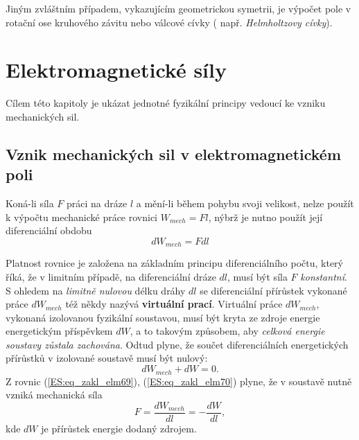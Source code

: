     Jiným zvláštním případem, vykazujícím geometrickou symetrii, je výpočet pole v rotační ose 
    kruhového závitu nebo válcové cívky ( např. \emph{Helmholtzovy cívky}). 
    
  \section{Elektromagnetické síly}\label{ES:sec11}
    Cílem této kapitoly je ukázat jednotné fyzikální principy vedoucí ke vzniku mechanických sil.
    
    \subsection{Vznik mechanických sil v elektromagnetickém poli}
      Koná-li síla \(F\) práci na dráze \(l\) a mění-li během pohybu svoji velikost, nelze použít k 
      výpočtu mechanické práce rovnici \(W_{mech}= Fl\), nýbrž je nutno použít její diferenciální 
      obdobu
      \begin{equation}\label{ES:eq_zakl_elm69}
        dW_{mech} = Fdl
      \end{equation}
      
      Platnost rovnice je založena na základním principu diferenciálního počtu, který říká, že v 
      limitním případě, na diferenciální dráze \(dl\), musí být síla \(F\) \emph{konstantní}. S 
      ohledem na \emph{limitně nulovou} délku dráhy \(dl\) se diferenciální přírůstek vykonané 
      práce \(dW_{mech}\) též někdy nazývá \textbf{virtuální prací}. Virtuální práce \(dW_{mech}\), 
      vykonaná izolovanou fyzikální soustavou, musí být kryta ze zdroje energie energetickým 
      příspěvkem \(dW\), a to takovým způsobem, aby \emph{celková energie soustavy zůstala 
      zachována}. Odtud plyne, že součet diferenciálních energetických přírůstků v izolované 
      soustavě musí být nulový:
      \begin{equation}\label{ES:eq_zakl_elm70}
        dW_{mech}+dW=0.
      \end{equation}
      Z rovnic (\ref{ES:eq_zakl_elm69}), (\ref{ES:eq_zakl_elm70}) plyne, že v soustavě nutně vzniká 
      mechanická síla
      \begin{equation}\label{ES:eq_zakl_elm71}
        \boxed{F = \frac{dW_{mech}}{dl} = -\frac{dW}{dl}},
      \end{equation}
      kde \(dW\) je přírůstek energie dodaný zdrojem.
      
